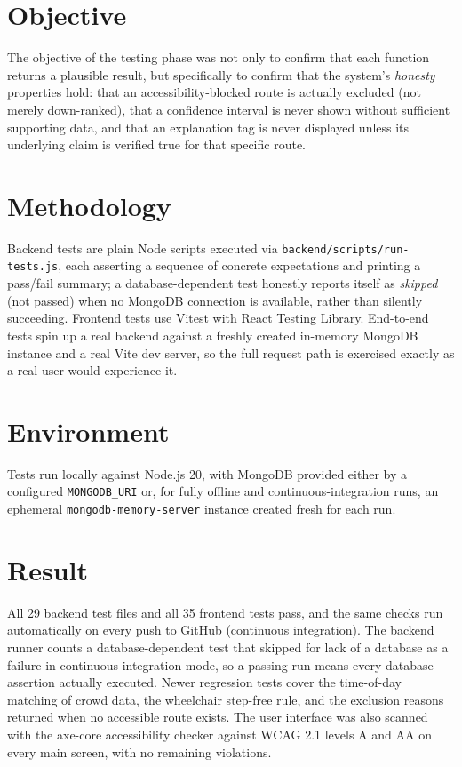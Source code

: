 \documentclass[12pt,a4paper]{report}
\begin{document}
\section{Objective}

The objective of the testing phase was not only to confirm that each function returns a plausible
result, but specifically to confirm that the system's \emph{honesty} properties hold: that an
accessibility-blocked route is actually excluded (not merely down-ranked), that a confidence
interval is never shown without sufficient supporting data, and that an explanation tag is never
displayed unless its underlying claim is verified true for that specific route.

\section{Methodology}

Backend tests are plain Node scripts executed via \texttt{backend/scripts/run-tests.js}, each
asserting a sequence of concrete expectations and printing a pass/fail summary; a database-dependent
test honestly reports itself as \emph{skipped} (not passed) when no MongoDB connection is available,
rather than silently succeeding. Frontend tests use Vitest with React Testing Library. End-to-end
tests spin up a real backend against a freshly created in-memory MongoDB instance and a real Vite
dev server, so the full request path is exercised exactly as a real user would experience it.

\section{Environment}

Tests run locally against Node.js 20, with MongoDB provided either by a configured
\texttt{MONGODB\_URI} or, for fully offline and continuous-integration runs, an ephemeral
\texttt{mongodb-memory-server} instance created fresh for each run.

\section{Result}

All 29 backend test files and all 35 frontend tests pass, and the same checks run automatically on
every push to GitHub (continuous integration). The backend runner counts a database-dependent test that
skipped for lack of a database as a failure in continuous-integration mode, so a passing run means every
database assertion actually executed. Newer regression tests cover the time-of-day matching of crowd data,
the wheelchair step-free rule, and the exclusion reasons returned when no accessible route exists. The
user interface was also scanned with the axe-core accessibility checker against WCAG 2.1 levels A and AA on
every main screen, with no remaining violations.
\end{document}
